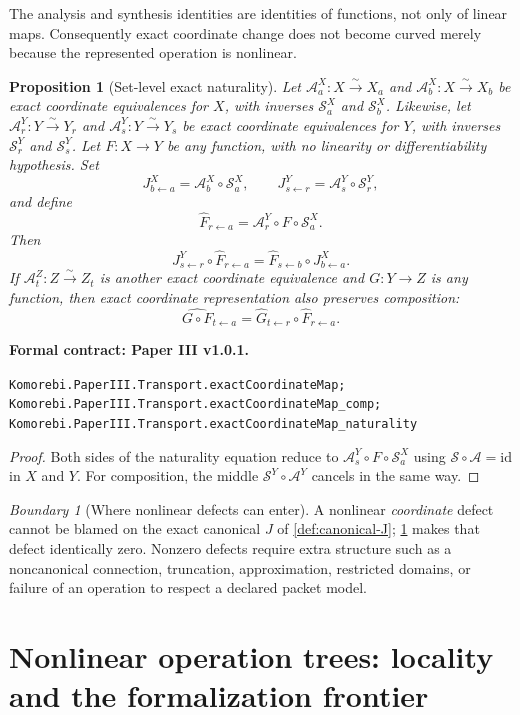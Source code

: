 \documentclass[11pt,a4paper]{article}
\theoremstyle{plain}
\newtheorem{proposition}[proposition]{Proposition}
\theoremstyle{definition}
\theoremstyle{remark}
\newtheorem{boundary}[boundary]{Boundary}
\newcommand{\cA}{\mathcal A}
\newcommand{\cS}{\mathcal S}
\newcommand{\id}{\mathrm{id}}
\newcommand{\leanname}[1]{\nolinkurl{#1}}
\newcommand{\statusleanthree}[1]{\par\smallskip\noindent\begin{minipage}{\linewidth}{\color{leanblue}\textbf{Formal contract: Paper III v1.0.1.}}\par\begingroup\small\raggedright\leanname{#1}\par\endgroup\end{minipage}\par\smallskip}
\begin{document}
The analysis and synthesis identities are identities of functions, not only
of linear maps.  Consequently exact coordinate change does not become
curved merely because the represented operation is nonlinear.

\begin{proposition}[Set-level exact naturality]
\label{prop:set-naturality}
Let $\cA^X_a:X\xrightarrow{\sim}X_a$ and
$\cA^X_b:X\xrightarrow{\sim}X_b$ be exact coordinate equivalences for $X$,
with inverses $\cS^X_a$ and $\cS^X_b$.  Likewise, let
$\cA^Y_r:Y\xrightarrow{\sim}Y_r$ and
$\cA^Y_s:Y\xrightarrow{\sim}Y_s$ be exact coordinate equivalences for $Y$,
with inverses $\cS^Y_r$ and $\cS^Y_s$.  Let $F:X\to Y$ be any function, with
no linearity or differentiability hypothesis.  Set
\[
J^X_{b\leftarrow a}=\cA^X_b\circ\cS^X_a,
\qquad
J^Y_{s\leftarrow r}=\cA^Y_s\circ\cS^Y_r,
\]
and define
\[
\widehat F_{r\leftarrow a}
=
\cA^Y_r\circ F\circ\cS^X_a.
\]
Then
\[
J^Y_{s\leftarrow r}\circ\widehat F_{r\leftarrow a}
=
\widehat F_{s\leftarrow b}\circ J^X_{b\leftarrow a}.
\]
If $\cA^Z_t:Z\xrightarrow{\sim}Z_t$ is another exact coordinate equivalence
and $G:Y\to Z$ is any function, then exact coordinate representation also
preserves composition:
\[
\widehat{G\circ F}_{t\leftarrow a}
=
\widehat G_{t\leftarrow r}\circ\widehat F_{r\leftarrow a}.
\]
\end{proposition}
\statusleanthree{Komorebi.PaperIII.Transport.exactCoordinateMap; Komorebi.PaperIII.Transport.exactCoordinateMap_comp; Komorebi.PaperIII.Transport.exactCoordinateMap_naturality}

\begin{proof}
Both sides of the naturality equation reduce to
$\cA^Y_s\circ F\circ\cS^X_a$ using
$\cS\circ\cA=\id$ in $X$ and $Y$.  For composition, the middle
$\cS^Y\circ\cA^Y$ cancels in the same way.
\end{proof}

\begin{boundary}[Where nonlinear defects can enter]
A nonlinear \emph{coordinate} defect cannot be blamed on the exact canonical
$J$ of \cref{def:canonical-J}; \cref{prop:set-naturality} makes that defect
identically zero.  Nonzero defects require extra structure such as a
noncanonical connection, truncation, approximation, restricted domains, or
failure of an operation to respect a declared packet model.
\end{boundary}

\clearpage\section{Nonlinear operation trees: locality and the formalization frontier}
\label{sec:operation-trees}
\end{document}
